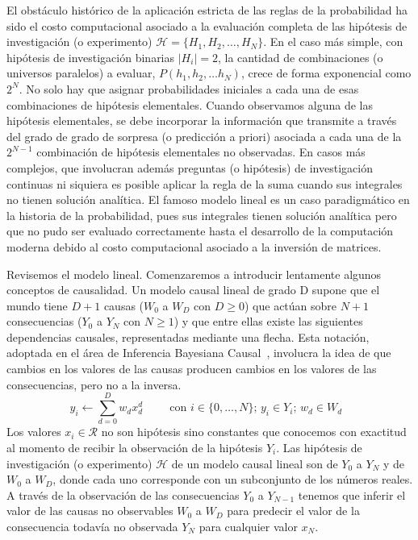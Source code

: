 \documentclass[a4paper,11pt]{book}
\theoremstyle{definition}
\begin{document}
El obst\'aculo hist\'orico de la aplicaci\'on estricta de las reglas de la probabilidad ha sido el costo computacional asociado a la evaluaci\'on completa de las hip\'otesis de investigaci\'on (o experimento) $\mathcal{H} = \{H_1, H_2, \dots, H_N\}$.
%
En el caso m\'as simple, con hip\'otesis de investigaci\'on binarias $|H_i|=2$, la cantidad de combinaciones (o universos paralelos) a evaluar, $P(h_1, h_2, \dots h_N)$, crece de forma exponencial como $2^N$.
%
No solo hay que asignar probabilidades iniciales a cada una de esas combinaciones de hip\'otesis elementales.
%
Cuando observamos alguna de las hip\'otesis elementales, se debe incorporar la informaci\'on que transmite a trav\'es del grado de grado de sorpresa (o predicci\'on a priori) asociada a cada una de la $2^{N-1}$ combinaci\'on de hip\'otesis elementales no observadas.
%
En casos m\'as complejos, que involucran adem\'as preguntas (o hip\'otesis) de investigaci\'on continuas ni siquiera es posible aplicar la regla de la suma cuando sus integrales no tienen soluci\'on anal\'itica.
%
El famoso modelo lineal es un caso paradigm\'atico en la historia de la probabilidad, pues sus integrales tienen soluci\'on anal\'itica pero que no pudo ser evaluado correctamente hasta el desarrollo de la computaci\'on moderna debido al costo computacional asociado a la inversi\'on de matrices.

%

Revisemos el modelo lineal.
%
Comenzaremos a introducir lentamente algunos conceptos de causalidad.
%
Un modelo causal lineal de grado D supone que el mundo tiene $D+1$ causas ($W_0$ a $W_D$ con $D\geq 0$) que act\'uan sobre $N+1$ consecuencias ($Y_0$ a $Y_{N}$ con $N\geq1$) y que entre ellas existe las siguientes dependencias causales, representadas mediante una flecha.
%
Esta notaci\'on, adoptada en el \'area de Inferencia Bayesiana Causal~\cite{pearl2009-causality}, involucra la idea de que cambios en los valores de las causas producen cambios en los valores de las consecuencias, pero no a la inversa.
%
\begin{equation*} \label{eq:modelo_lineal}
y_i \leftarrow \sum_{d = 0}^{D} w_d x_d^d \hspace{1cm} \text{con $i \in \{0, \dots,N\}$; $y_i \in Y_i$; $w_d \in W_d$ }
\end{equation*}
%
Los valores $x_i \in \mathcal{R}$ no son hip\'otesis sino constantes que conocemos con exactitud al momento de recibir la observaci\'on de la hip\'otesis $Y_i$.
%
Las hip\'otesis de investigaci\'on (o experimento) $\mathcal{H}$ de un modelo causal lineal son de $Y_0$ a $Y_N$ y de $W_0$ a $W_D$, donde cada uno corresponde con un subconjunto de los n\'umeros reales.
A trav\'es de la observaci\'on de las consecuencias $Y_0$ a $Y_{N-1}$ tenemos que inferir el valor de las causas no observables $W_0$ a $W_D$ para predecir el valor de la consecuencia todav\'ia no observada $Y_{N}$ para cualquier valor $x_{N}$.
\end{document}
